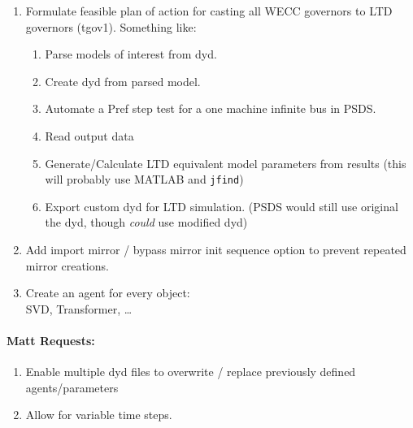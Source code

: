\documentclass[12pt]{article}
\begin{document}
\begin{multicols}{2}
\begin{enumerate}
		\item Formulate feasible plan of action for casting all WECC governors to LTD governors (tgov1). Something like:
		\begin{enumerate}
		\item Parse models of interest from dyd.
		\item Create dyd from parsed model.
		\item Automate a Pref step test for a one machine infinite bus in PSDS.
		\item Read output data
		\item Generate/Calculate LTD equivalent model parameters from results (this will probably use MATLAB and \verb|jfind|)
		\item Export custom dyd for LTD simulation. (PSDS would still use original the dyd, though \emph{could} use modified dyd)
		\end{enumerate}

		\item Add import mirror / bypass mirror init sequence option to prevent repeated mirror creations.

		\item Create an agent for every object: \\ SVD, Transformer, \ldots
		
	\end{enumerate}

\paragraph{Matt Requests:}
\begin{enumerate}
		\item Enable multiple dyd files to overwrite / replace previously defined agents/parameters
		\item Allow for variable time steps.
\end{enumerate}
		
		



\vfill\null

\end{multicols}


\newcommand{\mw}{\ensuremath{\text{ MW}}}
\newcommand{\hz}{\ensuremath{\text{ Hz}}}
\newcommand{\pu}{\ensuremath{\text{ Pu}}}
\newcommand{\sbase}{\ensuremath{\text{S}_{\text{Base}}}}
\newcommand{\fbase}{\ensuremath{f_{\text{Base}}}}
\newcommand{\mbase}[1]{\ensuremath{\text{M}_{\text{Base}_{#1}}}}
\newcommand{\hsys}{\ensuremath{\text{ H}_{\text{sys}}}}
\end{document}
